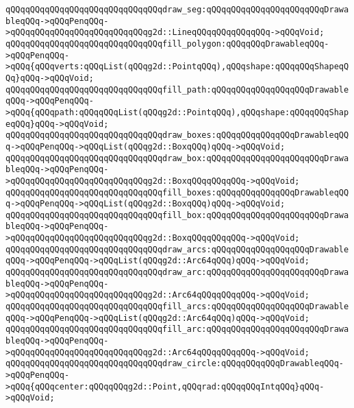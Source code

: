 \verb|qQQqqQQqqQQqqQQqqQQqqQQqqQQqqQQqdraw_seg:qQQqqQQqqQQqqQQqqQQqqQQqDrawableqQQq->qQQqPenqQQq->qQQqqQQqqQQqqQQqqQQqqQQqqQQqg2d::LineqQQqqQQqqQQqqQQq->qQQqVoid;|\newline
\newline
\verb|qQQqqQQqqQQqqQQqqQQqqQQqqQQqqQQqfill_polygon:qQQqqQQqDrawableqQQq->qQQqPenqQQq->qQQq{qQQqverts:qQQqList(qQQqg2d::PointqQQq),qQQqshape:qQQqqQQqShapeqQQq}qQQq->qQQqVoid;|\newline
\verb|qQQqqQQqqQQqqQQqqQQqqQQqqQQqqQQqfill_path:qQQqqQQqqQQqqQQqqQQqDrawableqQQq->qQQqPenqQQq->qQQq{qQQqpath:qQQqqQQqList(qQQqg2d::PointqQQq),qQQqshape:qQQqqQQqShapeqQQq}qQQq->qQQqVoid;|\newline
\newline
\verb|qQQqqQQqqQQqqQQqqQQqqQQqqQQqqQQqdraw_boxes:qQQqqQQqqQQqqQQqDrawableqQQq->qQQqPenqQQq->qQQqList(qQQqg2d::BoxqQQq)qQQq->qQQqVoid;|\newline
\verb|qQQqqQQqqQQqqQQqqQQqqQQqqQQqqQQqdraw_box:qQQqqQQqqQQqqQQqqQQqqQQqDrawableqQQq->qQQqPenqQQq->qQQqqQQqqQQqqQQqqQQqqQQqqQQqg2d::BoxqQQqqQQqqQQq->qQQqVoid;|\newline
\verb|qQQqqQQqqQQqqQQqqQQqqQQqqQQqqQQqfill_boxes:qQQqqQQqqQQqqQQqDrawableqQQq->qQQqPenqQQq->qQQqList(qQQqg2d::BoxqQQq)qQQq->qQQqVoid;|\newline
\verb|qQQqqQQqqQQqqQQqqQQqqQQqqQQqqQQqfill_box:qQQqqQQqqQQqqQQqqQQqqQQqDrawableqQQq->qQQqPenqQQq->qQQqqQQqqQQqqQQqqQQqqQQqqQQqg2d::BoxqQQqqQQqqQQq->qQQqVoid;|\newline
\newline
\verb|qQQqqQQqqQQqqQQqqQQqqQQqqQQqqQQqdraw_arcs:qQQqqQQqqQQqqQQqqQQqDrawableqQQq->qQQqPenqQQq->qQQqList(qQQqg2d::Arc64qQQq)qQQq->qQQqVoid;|\newline
\verb|qQQqqQQqqQQqqQQqqQQqqQQqqQQqqQQqdraw_arc:qQQqqQQqqQQqqQQqqQQqqQQqDrawableqQQq->qQQqPenqQQq->qQQqqQQqqQQqqQQqqQQqqQQqqQQqg2d::Arc64qQQqqQQqqQQq->qQQqVoid;|\newline
\verb|qQQqqQQqqQQqqQQqqQQqqQQqqQQqqQQqfill_arcs:qQQqqQQqqQQqqQQqqQQqDrawableqQQq->qQQqPenqQQq->qQQqList(qQQqg2d::Arc64qQQq)qQQq->qQQqVoid;|\newline
\verb|qQQqqQQqqQQqqQQqqQQqqQQqqQQqqQQqfill_arc:qQQqqQQqqQQqqQQqqQQqqQQqDrawableqQQq->qQQqPenqQQq->qQQqqQQqqQQqqQQqqQQqqQQqqQQqg2d::Arc64qQQqqQQqqQQq->qQQqVoid;|\newline
\newline
\verb|qQQqqQQqqQQqqQQqqQQqqQQqqQQqqQQqdraw_circle:qQQqqQQqqQQqDrawableqQQq->qQQqPenqQQq->qQQq{qQQqcenter:qQQqqQQqg2d::Point,qQQqrad:qQQqqQQqIntqQQq}qQQq->qQQqVoid;|\newline
